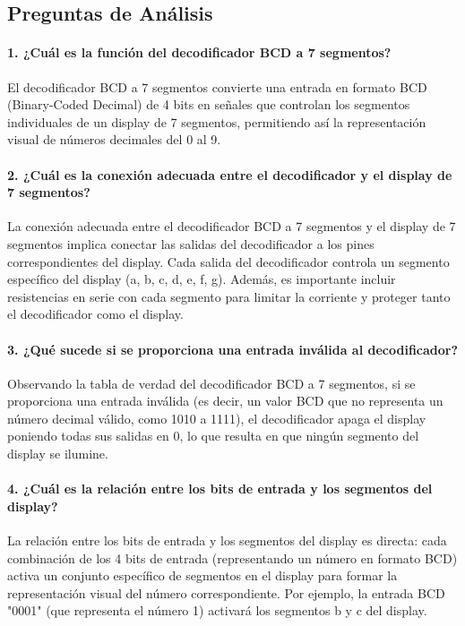 \subsection{Preguntas de Análisis}

\paragraph{1. ¿Cuál es la función del decodificador BCD a 7 segmentos?}

El decodificador BCD a 7 segmentos convierte una entrada en formato BCD (Binary-Coded Decimal) de 4 bits en señales que controlan los segmentos individuales de un display de 7 segmentos, permitiendo así la representación visual de números decimales del 0 al 9.

\paragraph{2. ¿Cuál es la conexión adecuada entre el decodificador y el display de 7 segmentos?}

La conexión adecuada entre el decodificador BCD a 7 segmentos y el display de 7 segmentos implica conectar las salidas del decodificador a los pines correspondientes del display. Cada salida del decodificador controla un segmento específico del display (a, b, c, d, e, f, g). Además, es importante incluir resistencias en serie con cada segmento para limitar la corriente y proteger tanto el decodificador como el display.

\paragraph{3. ¿Qué sucede si se proporciona una entrada inválida al decodificador?}

Observando la tabla de verdad del decodificador BCD a 7 segmentos, si se proporciona una entrada inválida (es decir, un valor BCD que no representa un número decimal válido, como 1010 a 1111), el decodificador apaga el display poniendo todas sus salidas en 0, lo que resulta en que ningún segmento del display se ilumine.

\paragraph{4. ¿Cuál es la relación entre los bits de entrada y los segmentos del display?}

La relación entre los bits de entrada y los segmentos del display es directa: cada combinación de los 4 bits de entrada (representando un número en formato BCD) activa un conjunto específico de segmentos en el display para formar la representación visual del número correspondiente. Por ejemplo, la entrada BCD "0001" (que representa el número 1) activará los segmentos b y c del display.

